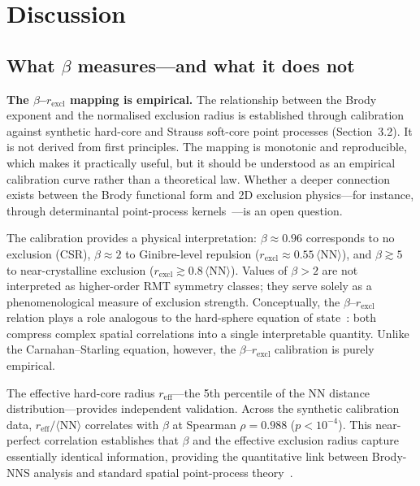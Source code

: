 \documentclass[final,3p,times,twocolumn]{elsarticle}
\theoremstyle{definition}
\begin{document}
\section{Discussion}

\subsection{What $\beta$ measures---and what it does not}

\textbf{The $\beta$--$r_{\text{excl}}$ mapping is empirical.}
The relationship between the Brody exponent and the normalised
exclusion radius is established through calibration against synthetic
hard-core and Strauss soft-core point processes (Section~3.2). It is
not derived from first principles. The mapping is monotonic and
reproducible, which makes it practically useful, but it should be
understood as an empirical calibration curve rather than a theoretical
law. Whether a deeper connection exists between the Brody functional
form and 2D exclusion physics---for instance, through determinantal
point-process kernels~\cite{FORRESTER-2010}---is an open question.

The calibration provides a physical interpretation: $\beta\approx0.96$
corresponds to no exclusion (CSR), $\beta\approx2$ to Ginibre-level
repulsion ($r_{\text{excl}}\approx0.55\,\langle\text{NN}\rangle$),
and $\beta\gtrsim5$ to near-crystalline exclusion
($r_{\text{excl}}\gtrsim0.8\,\langle\text{NN}\rangle$). Values of
$\beta>2$ are not interpreted as higher-order RMT symmetry classes;
they serve solely as a phenomenological measure of exclusion strength.
Conceptually, the $\beta$--$r_{\text{excl}}$ relation plays a role
analogous to the hard-sphere equation of state~\cite{TORQUATO-2002}:
both compress complex spatial correlations into a single interpretable
quantity. Unlike the Carnahan--Starling equation, however, the
$\beta$--$r_{\text{excl}}$ calibration is purely empirical.

The effective hard-core radius $r_{\text{eff}}$---the 5th percentile
of the NN distance distribution---provides independent validation.
Across the synthetic calibration data,
$r_{\text{eff}}/\langle\text{NN}\rangle$ correlates with $\beta$ at
Spearman $\rho=0.988$ ($p<10^{-4}$). This near-perfect correlation
establishes that $\beta$ and the effective exclusion radius capture
essentially identical information, providing the quantitative link
between Brody-NNS analysis and standard spatial point-process
theory~\cite{BADDELEY-2015}.
\end{document}
